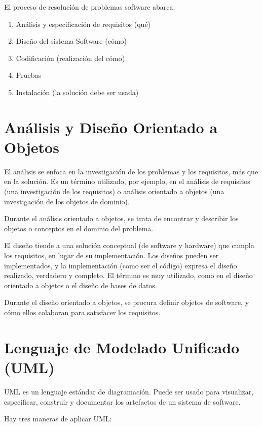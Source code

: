 El proceso de resolución de problemas software abarca:

\begin{enumerate}
    \item Análisis y especificación de requisitos (qué)
    \item Diseño del sistema Software (cómo)
    \item Codificación (realización del cómo)
    \item Pruebas
    \item Instalación (la solución debe ser usada)
\end{enumerate}

\section{Análisis y Diseño Orientado a Objetos}

El análisis se enfoca en la investigación de los problemas y los requisitos, más que en la solución. Es un término utilizado, por ejemplo, en el análisis de requisitos (una investigación de los requisitos) o análisis orientado a objetos (una investigación de los objetos de dominio).

Durante el análisis orientado a objetos, se trata de encontrar y describir los objetos o conceptos en el dominio del problema.

El diseño tiende a una solución conceptual (de software y hardware) que cumpla los requisitos, en lugar de su implementación. Los diseños pueden ser implementados, y la implementación (como ser el código) expresa el diseño realizado, verdadero y completo.
El término es muy utilizado, como en el diseño orientado a objetos o el diseño de bases de datos.

Durante el diseño orientado a objetos, se procura definir objetos de software, y cómo ellos colaboran para satisfacer los requisitos.

\section{Lenguaje de Modelado Unificado (UML)}

UML es un lenguaje estándar de diagramación. Puede ser usado para visualizar, especificar, construir y documentar los artefactos de un sistema de software.

Hay tres maneras de aplicar UML:

